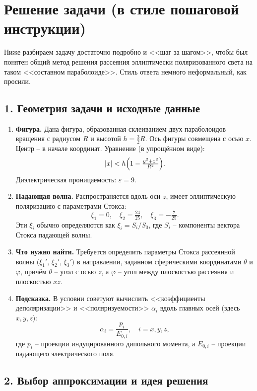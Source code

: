 \documentclass{article}
\begin{document}
\section*{Решение задачи (в стиле пошаговой инструкции)}

Ниже разбираем задачу достаточно подробно и <<шаг за шагом>>, чтобы был понятен общий метод решения рассеяния эллиптически поляризованного света на таком <<составном параболоиде>>. Стиль ответа немного неформальный, как просили.

\subsection*{1. Геометрия задачи и исходные данные}

\begin{enumerate}
  \item \textbf{Фигура.} Дана фигура, образованная склеиванием двух параболоидов вращения с радиусом $R$ и высотой $h = \tfrac{3}{2} R$. Ось фигуры совмещена с осью $x$. Центр – в начале координат. Уравнение (в упрощённом виде):
  \[
    |x| < h\Bigl(1 - \tfrac{y^2 + z^2}{R^2}\Bigr).
  \]
  Диэлектрическая проницаемость: $\varepsilon = 9$.

  \item \textbf{Падающая волна.} Распространяется вдоль оси $z$, имеет эллиптическую поляризацию с параметрами Стокса:
  \[
    \xi_1 = 0,\quad \xi_2 = \tfrac{24}{25},\quad \xi_3 = -\tfrac{7}{25}.
  \]
  Эти $\xi_i$ обычно определяются как $\xi_i = S_i / S_0$, где $S_i$ – компоненты вектора Стокса падающей волны.

  \item \textbf{Что нужно найти.} Требуется определить параметры Стокса рассеянной волны $\bigl(\xi_1', \, \xi_2', \, \xi_3'\bigr)$ в направлении, заданном сферическими координатами $\theta$ и $\varphi$, причём $\theta$ – угол с осью $z$, а $\varphi$ – угол между плоскостью рассеяния и плоскостью $xz$.

  \item \textbf{Подсказка.} В условии советуют вычислить <<коэффициенты деполяризации>> и <<поляризуемости>> $\alpha_i$ вдоль главных осей (здесь $x,y,z$):
  \[
    \alpha_i = \frac{p_i}{E_{0,i}}, \quad i = x,y,z,
  \]
  где $p_i$ – проекции индуцированного дипольного момента, а $E_{0,i}$ – проекции падающего электрического поля.
\end{enumerate}

\subsection*{2. Выбор аппроксимации и идея решения}
\end{document}
